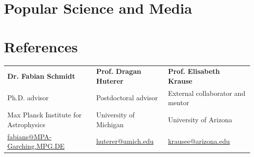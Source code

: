 \section*{Popular Science and Media}

\section*{References}
\begin{tabularx}{\textwidth}{@{}X X X@{}}
\textbf{Dr. Fabian Schmidt} & \textbf{Prof. Dragan Huterer} & \textbf{Prof. Elisabeth Krause}\\
Ph.D. advisor & Postdoctoral advisor & External collaborator and mentor\\
Max Planck Institute for Astrophysics & University of Michigan & University of Arizona\\
\href{mailto:fabians@MPA-Garching.MPG.DE}{fabians@MPA-Garching.MPG.DE} &
\href{mailto:huterer@umich.edu}{huterer@umich.edu} &
\href{mailto:krausee@arizona.edu}{krausee@arizona.edu}
\end{tabularx}


